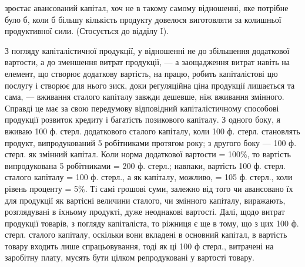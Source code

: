 \parcont{}  %
зростає авансований капітал, хоч не в такому самому відношенні, яке потрібне
було б, коли б більшу кількість продукту довелося виготовляти за колишньої
продуктивної сили. (Стосується до відділу I).

З погляду капіталістичної продукції, у відношенні не до збільшення додаткової
вартости, а до зменшення витрат продукції, — а заощадження витрат
навіть на елемент, що створює додаткову вартість, на працю, робить капіталістові
цю послугу і створює для нього зиск, доки регуляційна ціна продукції
лишається та сама, — вживання сталого капіталу завжди дешевше, ніж
вживання змінного. Справді це має за свою передумову відповідний капіталістичному
способові продукції розвиток кредиту і багатість позикового капіталу. З одного
боку, я вживаю 100 ф. стерл. додаткового сталого капіталу, коли 100 ф.
стерл. становлять продукт, випродукований 5 робітниками протягом року; з
другого боку — 100 ф. стерл. як змінний капітал. Коли норма додаткової вартости
= 100\%, то вартість випродукована 5 робітниками = 200 ф. стерл.;
навпаки, вартість 100 ф. стерл. сталого капіталу = 100 ф. стерл., а як капіталу,
можливо, = 105 ф. стерл., коли рівень проценту = 5\%. Ті самі грошові суми,
залежно від того чи авансовано їх для продукції як вартісні величини сталого,
чи змінного капіталу, виражають, розглядувані в їхньому продукті, дуже неоднакові
вартості. Далі, щодо витрат продукції товарів, з погляду капіталіста,
то ріжниця є ще в тому, що з цих 100 ф. стерл. сталого капіталу, оскільки
вони вкладені в основний капітал, в вартість товару входить лише спрацьовування,
тоді як ці 100 ф стерл., витрачені на заробітну плату, мусять бути
цілком репродуковані у вартості товару.

